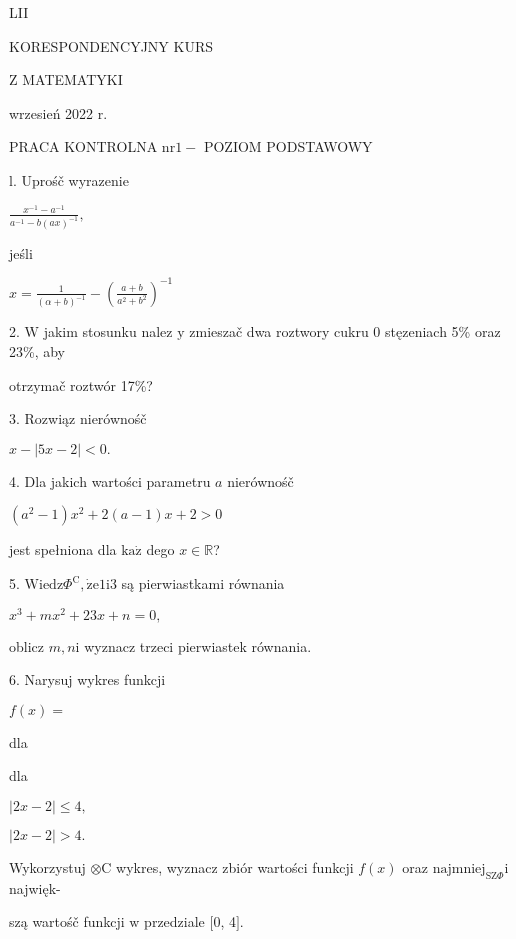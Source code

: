 \documentclass[a4paper,12pt]{article}
\begin{document}
LII

KORESPONDENCYJNY KURS

Z MATEMATYKI

wrzesień 2022 r.

PRACA KONTROLNA $\mathrm{n}\mathrm{r} 1-$ POZIOM PODSTAWOWY

l. Uprośč wyrazenie

$\displaystyle \frac{x^{-1}-a^{-1}}{a^{-1}-b(ax)^{-1}},$

jeśli

$x=\displaystyle \frac{1}{(\alpha+b)^{-1}}- (\displaystyle \frac{a+b}{a^{2}+b^{2}})^{-1}$

2. $\mathrm{W}$ jakim stosunku nalez $\mathrm{y}$ zmieszač dwa roztwory cukru $0$ stęzeniach 5\% oraz 23\%, aby

otrzymač roztwór 17\%?

3. Rozwiąz nierównośč

$x-|5x-2|<0.$

4. Dla jakich wartości parametru $a$ nierównośč

$(a^{2}-1)x^{2}+2(a-1)x+2>0$

jest spełniona dla $\mathrm{k}\mathrm{a}\dot{\mathrm{z}}$ dego $x\in \mathbb{R}$?

5. $\mathrm{W}\mathrm{i}\mathrm{e}\mathrm{d}\mathrm{z}\Phi^{\mathrm{C}}, \dot{\mathrm{z}}\mathrm{e}1\mathrm{i}3$ są pierwiastkami równania

$x^{3}+mx^{2}+23x+n=0,$

oblicz $m, n\mathrm{i}$ wyznacz trzeci pierwiastek równania.

6. Narysuj wykres funkcji

$f(x)=$

dla

dla

$|2x-2|\leq 4,$

$|2x-2|>4.$

Wykorzystuj $\otimes \mathrm{C}$ wykres, wyznacz zbiór wartości funkcji $f(x)$ oraz $\mathrm{n}\mathrm{a}\mathrm{j}\mathrm{m}\mathrm{n}\mathrm{i}\mathrm{e}\mathrm{j}_{\mathrm{S}\mathrm{Z}\Phi}\mathrm{i}$ najwięk-

szą wartośč funkcji $\mathrm{w}$ przedziale $[0$, 4$].$
\end{document}
